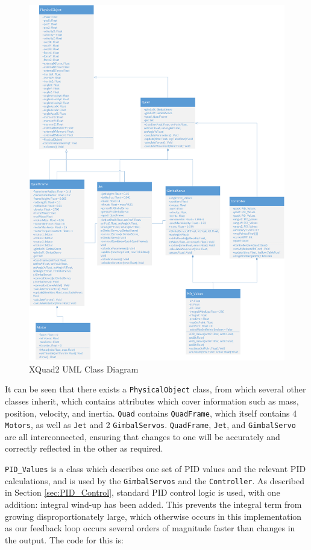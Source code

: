 \documentclass[11pt]{article}
\begin{document}
\begin{figure}
    \includegraphics[width=\linewidth]{XQuad_2_Class_Diagram}
    \caption{XQuad2 UML Class Diagram}
    \label{fig:XQuad_2_Class_Diagram}
\end{figure}

It can be seen that there exists a \lstinline|PhysicalObject| class, from which several other classes inherit, which contains attributes which cover information such as mass, position, velocity, and inertia. \lstinline|Quad| contains \lstinline|QuadFrame|, which itself contains 4 \lstinline|Motors|, as well as \lstinline|Jet| and 2 \lstinline|GimbalServos|. \lstinline|QuadFrame|, \lstinline|Jet|, and \lstinline|GimbalServo| are all interconnected, ensuring that changes to one will be accurately and correctly reflected in the other as required.

\lstinline|PID_Values| is a class which describes one set of PID values and the relevant PID calculations, and is used by the \lstinline|GimbalServos| and the \lstinline|Controller|. As described in Section \ref{sec:PID_Control}, standard PID control logic is used, with one addition: integral wind-up has been added. This prevents the integral term from growing disproportionately large, which otherwise occurs in this implementation as our feedback loop occurs several orders of magnitude faster than changes in the output. The code for this is:
\end{document}
